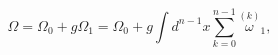 \begin{equation}
\Omega =\Omega _{0}+g\Omega _{1}=\Omega _{0}+g\int
d^{n-1}x\sum\limits_{k=0}^{n-1}\stackrel{(k)}{\omega }_{1},  \label{c29}
\end{equation}

